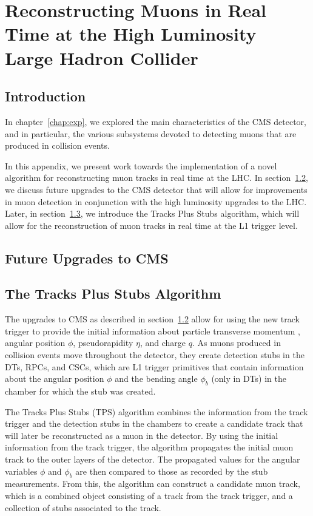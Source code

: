 
\chapter{Reconstructing Muons in Real Time at the High Luminosity Large Hadron Collider}
\label{chap:TPSAppendix}

\section{Introduction}

In chapter~\ref{chap:exp}, we explored the main characteristics of the CMS detector, and in particular, the various subsystems devoted to detecting muons that are produced in collision events.

In this appendix, we present work towards the implementation of a novel algorithm for reconstructing muon tracks in real time at the LHC.
In section~\ref{sec:CMSUpgrade}, we discuss future upgrades to the CMS detector that will allow for improvements in muon detection in conjunction with the high luminosity upgrades to the LHC.
Later, in section~\ref{sec:TPS}, we introduce the Tracks Plus Stubs algorithm, which will allow for the reconstruction of muon tracks in real time at the L1 trigger level.

\section{Future Upgrades to CMS}
\label{sec:CMSUpgrade}

\section{The Tracks Plus Stubs Algorithm}
\label{sec:TPS}

The upgrades to CMS as described in section~\ref{sec:CMSUpgrade} allow for using the new track trigger to provide the initial information about particle transverse momentum \pt, angular position $\phi$, pseudorapidity $\eta$, and charge $q$.
As muons produced in collision events move throughout the detector, they create detection stubs in the DTs, RPCs, and CSCs, which are L1 trigger primitives that contain information about the angular position $\phi$ and the bending angle $\phi_b$ (only in DTs) in the chamber for which the stub was created.

The Tracks Plus Stubs (TPS) algorithm combines the information from the track trigger and the detection stubs in the chambers to create a candidate track that will later be reconstructed as a muon in the detector.
By using the initial information from the track trigger, the algorithm propagates the initial muon track to the outer layers of the detector.
The propagated values for the angular variables $\phi$ and $\phi_b$ are then compared to those as recorded by the stub measurements.
From this, the algorithm can construct a candidate muon track, which is a combined object consisting of a track from the track trigger, and a collection of stubs associated to the track.

